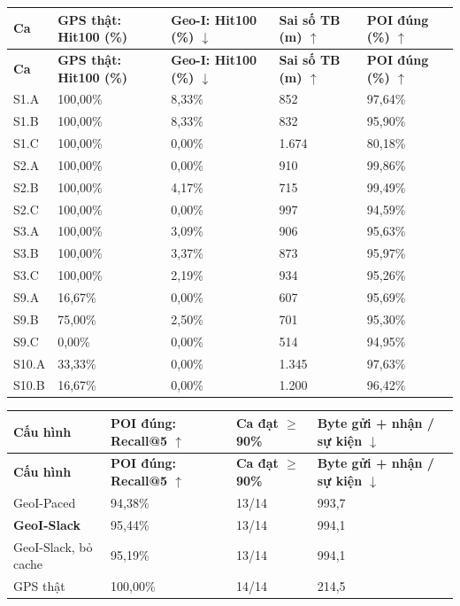 \begingroup\small
\begin{longtable}{@{}P{1.618cm}P{3.741cm}P{3.741cm}P{3.640cm}P{3.336cm}@{}}
\toprule
\textbf{Ca} & \textbf{GPS thật: Hit100 (\%)} & \textbf{Geo-I: Hit100 (\%) $\downarrow$} & \textbf{Sai số TB (m) $\uparrow$} & \textbf{POI đúng (\%) $\uparrow$}\\\midrule
\endfirsthead
\toprule
\textbf{Ca} & \textbf{GPS thật: Hit100 (\%)} & \textbf{Geo-I: Hit100 (\%) $\downarrow$} & \textbf{Sai số TB (m) $\uparrow$} & \textbf{POI đúng (\%) $\uparrow$}\\\midrule
\endhead
\bottomrule\endfoot
S1.A & 100,00\% & 8,33\% & 852 & 97,64\%\\
\addlinespace[3pt]
S1.B & 100,00\% & 8,33\% & 832 & 95,90\%\\
\addlinespace[3pt]
S1.C & 100,00\% & 0,00\% & 1.674 & 80,18\%\\
\addlinespace[3pt]
S2.A & 100,00\% & 0,00\% & 910 & 99,86\%\\
\addlinespace[3pt]
S2.B & 100,00\% & 4,17\% & 715 & 99,49\%\\
\addlinespace[3pt]
S2.C & 100,00\% & 0,00\% & 997 & 94,59\%\\
\addlinespace[3pt]
S3.A & 100,00\% & 3,09\% & 906 & 95,63\%\\
\addlinespace[3pt]
S3.B & 100,00\% & 3,37\% & 873 & 95,97\%\\
\addlinespace[3pt]
S3.C & 100,00\% & 2,19\% & 934 & 95,26\%\\
\addlinespace[3pt]
S9.A & 16,67\% & 0,00\% & 607 & 95,69\%\\
\addlinespace[3pt]
S9.B & 75,00\% & 2,50\% & 701 & 95,30\%\\
\addlinespace[3pt]
S9.C & 0,00\% & 0,00\% & 514 & 94,95\%\\
\addlinespace[3pt]
S10.A & 33,33\% & 0,00\% & 1.345 & 97,63\%\\
\addlinespace[3pt]
S10.B & 16,67\% & 0,00\% & 1.200 & 96,42\%\\
\end{longtable}
\endgroup
\begingroup\small
\begin{longtable}{@{}P{4.839cm}P{3.581cm}P{3.194cm}P{4.742cm}@{}}
\toprule
\textbf{Cấu hình} & \textbf{POI đúng: Recall@5 $\uparrow$} & \textbf{Ca đạt $\ge$90\%} & \textbf{Byte gửi + nhận / sự kiện $\downarrow$}\\\midrule
\endfirsthead
\toprule
\textbf{Cấu hình} & \textbf{POI đúng: Recall@5 $\uparrow$} & \textbf{Ca đạt $\ge$90\%} & \textbf{Byte gửi + nhận / sự kiện $\downarrow$}\\\midrule
\endhead
\bottomrule\endfoot
GeoI-Paced & 94,38\% & 13/14 & 993,7\\
\addlinespace[3pt]
\textbf{GeoI-Slack} & 95,44\% & 13/14 & 994,1\\
\addlinespace[3pt]
GeoI-Slack, bỏ cache & 95,19\% & 13/14 & 994,1\\
\addlinespace[3pt]
GPS thật & 100,00\% & 14/14 & 214,5\\
\end{longtable}
\endgroup
{}

